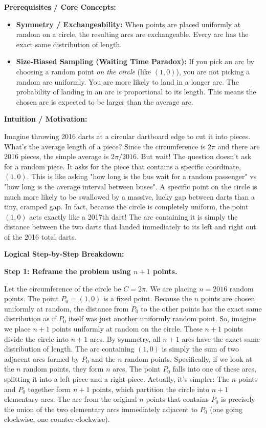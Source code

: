 \begin{solution}
\textbf{Prerequisites / Core Concepts:}
\begin{itemize}
    \item \textbf{Symmetry / Exchangeability:} When points are placed uniformly at random on a circle, the resulting arcs are exchangeable. Every arc has the exact same distribution of length.
    \item \textbf{Size-Biased Sampling (Waiting Time Paradox):} If you pick an arc by choosing a random point \textit{on the circle} (like $(1,0)$), you are not picking a random arc uniformly. You are more likely to land in a longer arc. The probability of landing in an arc is proportional to its length. This means the chosen arc is expected to be larger than the average arc.
\end{itemize}

\textbf{Intuition / Motivation:}

Imagine throwing 2016 darts at a circular dartboard edge to cut it into pieces. What's the average length of a piece? Since the circumference is $2\pi$ and there are 2016 pieces, the simple average is $2\pi / 2016$. 
But wait! The question doesn't ask for a random piece. It asks for the piece that contains a specific coordinate, $(1,0)$. This is like asking "how long is the bus wait for a random passenger" vs "how long is the average interval between buses". A specific point on the circle is much more likely to be swallowed by a massive, lucky gap between darts than a tiny, cramped gap. In fact, because the circle is completely uniform, the point $(1,0)$ acts exactly like a 2017th dart! The arc containing it is simply the distance between the two darts that landed immediately to its left and right out of the 2016 total darts.

\textbf{Logical Step-by-Step Breakdown:}

\textbf{Step 1: Reframe the problem using $n+1$ points.}

Let the circumference of the circle be $C = 2\pi$. We are placing $n = 2016$ random points.
The point $P_0 = (1,0)$ is a fixed point. Because the $n$ points are chosen uniformly at random, the distance from $P_0$ to the other points has the exact same distribution as if $P_0$ itself was just another uniformly random point.
So, imagine we place $n+1$ points uniformly at random on the circle.
These $n+1$ points divide the circle into $n+1$ arcs.
By symmetry, all $n+1$ arcs have the exact same distribution of length.
The arc containing $(1,0)$ is simply the sum of two adjacent arcs formed by $P_0$ and the $n$ random points. Specifically, if we look at the $n$ random points, they form $n$ arcs. The point $P_0$ falls into one of these arcs, splitting it into a left piece and a right piece.
Actually, it's simpler: The $n$ points and $P_0$ together form $n+1$ points, which partition the circle into $n+1$ elementary arcs. The arc from the original $n$ points that contains $P_0$ is precisely the union of the two elementary arcs immediately adjacent to $P_0$ (one going clockwise, one counter-clockwise).


\end{solution}
